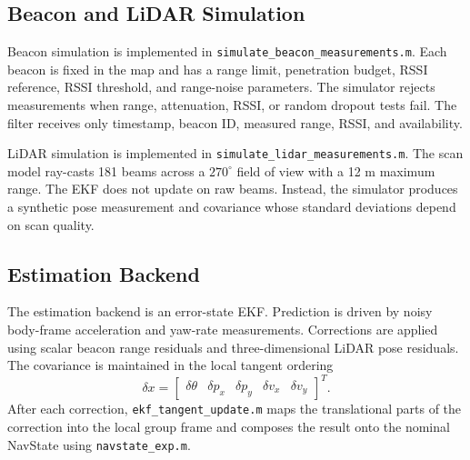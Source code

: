 \subsection{Beacon and LiDAR Simulation}

Beacon simulation is implemented in \texttt{simulate\_beacon\_measurements.m}. Each beacon is fixed in the map and has a range limit, penetration budget, RSSI reference, RSSI threshold, and range-noise parameters. The simulator rejects measurements when range, attenuation, RSSI, or random dropout tests fail. The filter receives only timestamp, beacon ID, measured range, RSSI, and availability.

LiDAR simulation is implemented in \texttt{simulate\_lidar\_measurements.m}. The scan model ray-casts 181 beams across a \(270^\circ\) field of view with a 12 m maximum range. The EKF does not update on raw beams. Instead, the simulator produces a synthetic pose measurement and covariance whose standard deviations depend on scan quality. 

\subsection{Estimation Backend}

The estimation backend is an error-state EKF. Prediction is driven by noisy body-frame acceleration and yaw-rate measurements. Corrections are applied using scalar beacon range residuals and three-dimensional LiDAR pose residuals. The covariance is maintained in the local tangent ordering
\begin{equation}
    \delta x =
    \begin{bmatrix}
    \delta \theta & \delta p_x & \delta p_y & \delta v_x & \delta v_y
    \end{bmatrix}^{T}.
\end{equation}
After each correction, \texttt{ekf\_tangent\_update.m} maps the translational parts of the correction into the local group frame and composes the result onto the nominal NavState using \texttt{navstate\_exp.m}.
